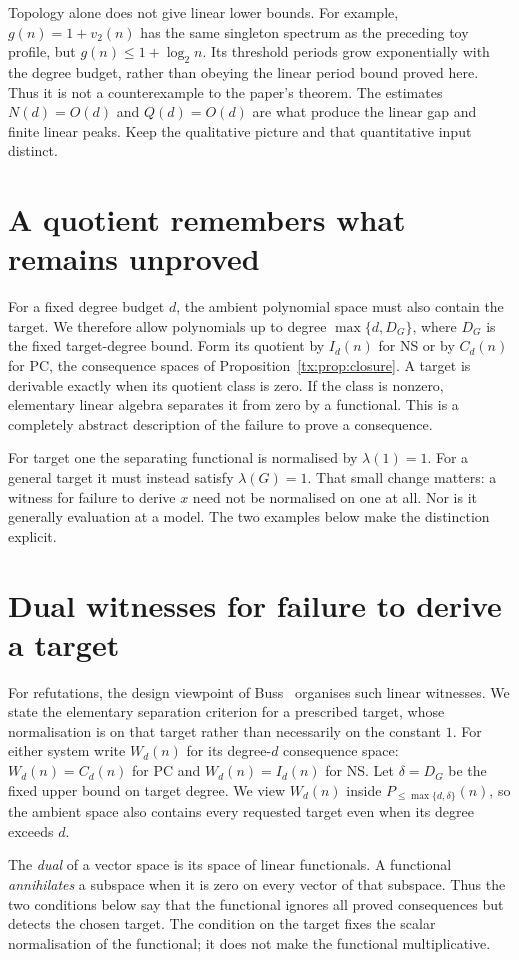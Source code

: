 \documentclass[11pt,a4paper,oneside,openany]{book}
\theoremstyle{definition}\newtheorem{definition}[theorem]{Definition}
\theoremstyle{remark}\newtheorem{remark}[theorem]{Remark}
\numberwithin{equation}{chapter}
\begin{document}
Topology alone does not give linear lower bounds. For example,
$g(n)=1+v_2(n)$ has the same singleton spectrum as the preceding toy
profile, but $g(n)\le1+\log_2 n$. Its threshold periods grow
exponentially with the degree budget, rather than obeying the linear
period bound proved here. Thus it is not a counterexample to the
paper's theorem. The estimates $N(d)=O(d)$ and $Q(d)=O(d)$ are what
produce the linear gap and finite linear peaks. Keep the qualitative
picture and that quantitative input distinct.

\section{A quotient remembers what remains unproved}
For a fixed degree budget $d$, the ambient polynomial space must also
contain the target. We therefore allow polynomials up to degree
$\max\{d,D_G\}$, where $D_G$ is the fixed target-degree bound.
Form its quotient by $I_d(n)$ for NS or by $C_d(n)$ for PC, the consequence spaces
of Proposition~\ref{tx:prop:closure}. A target is derivable exactly when
its quotient class is zero. If the class is nonzero, elementary linear
algebra separates it from zero by a functional. This is a completely
abstract description of the failure to prove a consequence.

For target one the separating functional is normalised by $\lambda(1)=1$.
For a general target it must instead satisfy $\lambda(G)=1$.
That small change matters: a witness for failure to derive $x$ need not
be normalised on one at all. Nor is it generally evaluation at a model.
The two examples below make the distinction explicit.

\section{Dual witnesses for failure to derive a target}
For refutations, the design viewpoint of Buss~\cite{BussDesign}
organises such linear witnesses. We state the elementary separation
criterion for a prescribed target, whose normalisation is on that
target rather than necessarily on the constant $1$.
For either system write $W_d(n)$ for its degree-$d$ consequence space:
$W_d(n)=C_d(n)$ for PC and $W_d(n)=I_d(n)$ for NS. Let
$\delta=D_G$ be the fixed upper bound on target degree. We view
$W_d(n)$ inside $P_{\le\max\{d,\delta\}}(n)$, so the ambient space
also contains every requested target even when its degree exceeds $d$.

The \emph{dual} of a vector space is its space of linear functionals.
A functional \emph{annihilates} a subspace when it is zero on every
vector of that subspace. Thus the two conditions below say that the
functional ignores all proved consequences but detects the chosen
target. The condition on the target fixes the scalar normalisation of the
functional; it does not make the functional multiplicative.
\end{document}
